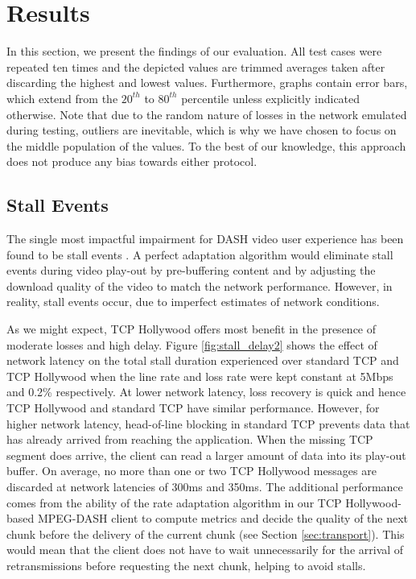\section{Results}
\label{sec:testing} 

In this section, we present the findings of our evaluation. All test cases were repeated
ten times and the depicted values are trimmed averages taken after discarding the highest
and lowest values. Furthermore, graphs contain error bars, which extend from the $20^{th}$ to $80^{th}$ percentile unless explicitly indicated otherwise. Note that due to the random nature of losses in the network emulated during testing, outliers are inevitable, which is why we have chosen to focus on the middle population of the values. To the best of our knowledge, this approach does not produce any bias towards either protocol. 

\subsection{Stall Events}
\label{sec:testing-stall}

The single most impactful impairment for DASH video user experience has been found to be
stall events \cite{hossfeld2011quantification}. A perfect adaptation algorithm would
eliminate stall events during video play-out by pre-buffering content and by adjusting the
download quality of the video to match the network performance. However, in reality, stall
events occur, due to imperfect estimates of network conditions.

As we might expect, TCP Hollywood offers most benefit in the presence of moderate losses and high
delay. Figure \ref{fig:stall_delay2} shows the effect of network latency on the total
stall duration experienced over standard TCP and TCP Hollywood when the line rate and loss
rate were kept constant at 5Mbps and 0.2\% respectively. At lower network latency, loss
recovery is quick and hence TCP Hollywood and standard TCP have similar performance.
However, for higher network latency, head-of-line blocking in standard TCP prevents data
that has already arrived from reaching the application. When the missing TCP segment does
arrive, the client can read a larger amount of data into its play-out buffer. On average,
no more than one or two TCP Hollywood messages are discarded at network latencies of 300ms and
350ms. The additional performance comes from the ability of the rate adaptation algorithm in 
our TCP Hollywood-based MPEG-DASH client to compute metrics and decide the quality of the 
next chunk before the delivery of the current chunk (see Section \ref{sec:transport}). 
This would mean that the client does not have to wait unnecessarily for the arrival of 
retransmissions before requesting the next chunk, helping to avoid stalls.

